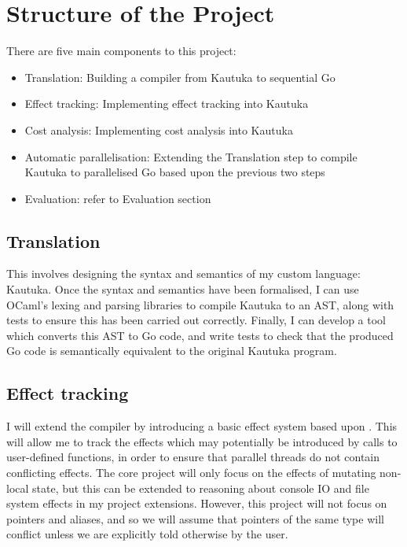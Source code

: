 \documentclass[12pt,a4paper,twoside]{article}
\begin{document}
\newpage 

\section{Structure of the Project}

There are five main components to this project:
\begin{itemize}
  \item Translation: Building a compiler from Kautuka to sequential Go
  \item Effect tracking: Implementing effect tracking into Kautuka 
  \item Cost analysis: Implementing cost analysis into Kautuka 
  \item Automatic parallelisation: Extending the Translation step to compile Kautuka to parallelised Go based upon the previous two steps
  \item Evaluation: refer to Evaluation section
\end{itemize}

\subsection*{Translation}

This involves designing the syntax and semantics of my custom language: Kautuka. Once the syntax and semantics have been formalised, I can use OCaml's lexing and parsing libraries to compile Kautuka to an AST, along with tests to ensure this has been carried out correctly. Finally, I can develop a tool which converts this AST to Go code, and write tests to check that the produced Go code is semantically equivalent to the original Kautuka program. 

\subsection*{Effect tracking}

I will extend the compiler by introducing a basic effect system based upon \cite{Optimising-Compilers-Lecture-13-Effect-Systems}. This will allow me to track the effects which may potentially be introduced by calls to user-defined functions, in order to ensure that parallel threads do not contain conflicting effects. The core project will only focus on the effects of mutating non-local state, but this can be extended to reasoning about console IO and file system effects in my project extensions. However, this project will not focus on pointers and aliases, and so we will assume that pointers of the same type will conflict unless we are explicitly told otherwise by the user.
\end{document}
